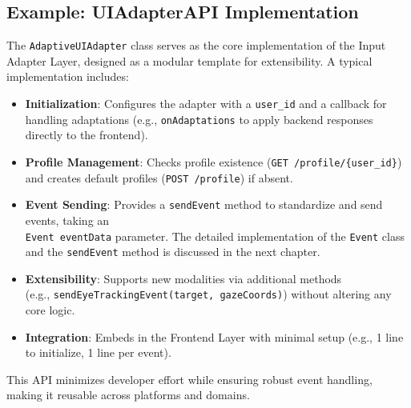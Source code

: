 \documentclass[openany]{book}
\begin{document}
    \subsection{Example: UIAdapterAPI Implementation}
    The \verb|AdaptiveUIAdapter| class serves as the core implementation of the Input Adapter Layer, designed as a modular template for extensibility. A typical implementation includes:
    \begin{itemize}
        \item \textbf{Initialization}: Configures the adapter with a \verb|user_id| and a callback for handling adaptations (e.g., \verb|onAdaptations| to apply backend responses directly to the frontend).
        \item \textbf{Profile Management}: Checks profile existence (\verb|GET /profile/{user_id}|) and creates default profiles (\verb|POST /profile|) if absent.
        \item \textbf{Event Sending}: Provides a \verb|sendEvent| method to standardize and send events, taking an \\ \verb|Event eventData| parameter. The detailed implementation of the \verb|Event| class and the \verb|sendEvent| method is discussed in the next chapter.
        \item \textbf{Extensibility}: Supports new modalities via additional methods \\ (e.g., \verb|sendEyeTrackingEvent(target, gazeCoords)|) without altering any core logic.
        \item \textbf{Integration}: Embeds in the Frontend Layer with minimal setup (e.g., 1 line to initialize, 1 line per event).
    \end{itemize}
    This API minimizes developer effort while ensuring robust event handling, making it reusable across platforms and domains.
\end{document}
